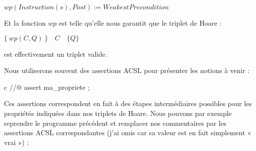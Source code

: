 $wp(Instruction(s), Post) := WeakestPrecondition$



Et la fonction $wp$ est telle qu'elle nous garantit que le triplet de Hoare :




\begin{center}
$\{\ wp(C,Q)\ \}\quad C\quad \{ Q \}$


\end{center}


est effectivement un triplet valide.



Nous utiliserons souvent des assertions ACSL pour présenter les notions à 
venir :



\begin{CodeBlock}{c}
//@ assert ma_propriete ;
\end{CodeBlock}



Ces assertions correspondent en fait à des étapes intermédiaires possibles pour
les propriétés indiquées dans nos triplets de Hoare. Nous pouvons par exemple
reprendre le programme précédent et remplacer nos commentaires par les assertions
ACSL correspondantes (j'ai omis  car sa valeur est en fait simplement
« vrai ») :





